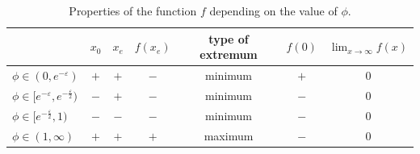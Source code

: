 \begin{table}[htbp]
  \centering
  \caption{Properties of the function $f$ depending on the value of $\phi$.}
  \label{tab:properities_of_f}
  \begin{tabular}{@{}lcccccc@{}}
    \toprule
    & $x_0$ & $x_e$ & $f(x_e)$ & type of extremum & $f(0)$ & $\lim_{x \to \infty} f(x)$ \\
    \midrule
    $\phi \in (0, e^{-\varepsilon})$ & $+$ & $+$ & $-$ & minimum & $+$ & $0$ \\
    $\phi \in [e^{-\varepsilon}, e^{-\frac{\varepsilon}{2}})$ & $-$ & $+$ & $-$ & minimum & $-$ & $0$ \\
    $\phi \in [e^{-\frac{\varepsilon}{2}}, 1)$ & $-$ & $-$ & $-$ & minimum & $-$ & $0$ \\
    $\phi \in (1, \infty)$ & $+$ & $+$ & $+$ & maximum & $-$ & $0$ \\
    \bottomrule
  \end{tabular}
\end{table}

